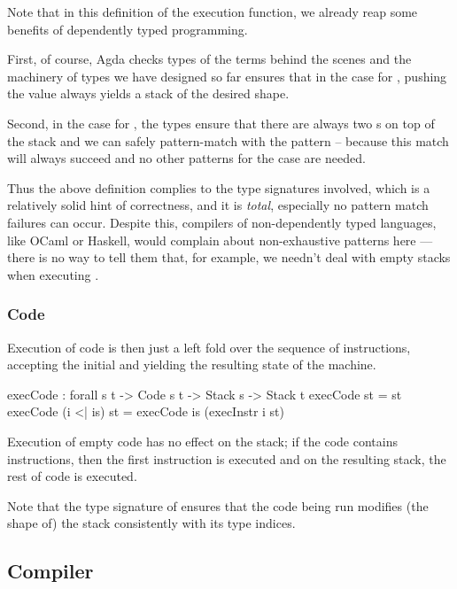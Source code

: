 Note that in this definition of the execution function, we already reap some
benefits of dependently typed programming.

First, of course, Agda checks types of the terms behind
the scenes and the machinery of types we have designed so far ensures that
in the case for , pushing the value  always yields
a stack of the desired shape.

Second, in the case for , the types ensure that there are always two
s on top of the stack and we can safely pattern-match with the
pattern  \scons {} \scons {} -- because this match
will always succeed and no other patterns for the  case are needed. 

Thus the above definition complies to the type signatures involved, which is a relatively
solid hint of correctness, and it is \emph{total}, especially no pattern match failures
can occur. Despite this, compilers of non-dependently typed languages, like OCaml or Haskell,
would complain about non-exhaustive patterns here --- there is no way to tell them
that, for example, we needn't deal with empty stacks when executing .


\subsubsection{Code}

Execution of code is then just a left fold over the sequence of instructions,
accepting the initial and yielding the resulting state of the machine.

\begin{code}
  execCode : forall {s t} -> Code s t -> Stack s -> Stack t
  execCode \nil st = st
  execCode (i <| is) st = execCode is (execInstr i st)
\end{code}

\noindent Execution of empty code has no effect on the stack; if the code
contains instructions, then the first instruction is executed and on the
resulting stack, the rest of code is executed.

Note that the type signature of  ensures that the code being
run modifies (the shape of) the stack consistently with its type indices.

\subsection{Compiler}

